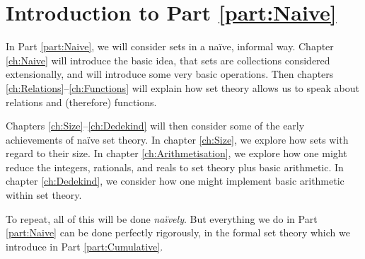 \documentclass[../../../include/open-logic-chapter]{subfiles}
\begin{document}
\chapter*{Introduction to Part \ref{part:Naive}}
\noindent In Part \ref{part:Naive}, we will consider sets in a na\"ive, informal way. Chapter \ref{ch:Naive} will introduce the basic idea, that sets are collections considered extensionally, and will introduce some very basic operations. Then chapters \ref{ch:Relations}--\ref{ch:Functions} will explain how set theory allows us to speak about relations and (therefore) functions. 

Chapters \ref{ch:Size}--\ref{ch:Dedekind} will then consider some of the early achievements of na\"ive set theory. In chapter \ref{ch:Size}, we explore how sets with regard to their size. In chapter \ref{ch:Arithmetisation}, we explore how one might reduce the integers, rationals, and reals to set theory plus basic arithmetic. In chapter \ref{ch:Dedekind}, we consider how one might implement basic arithmetic within set theory. 

To repeat, all of this will be done \emph{na\"ively}. But everything we do in Part \ref{part:Naive} can be done perfectly rigorously, in the formal set theory which we introduce in Part \ref{part:Cumulative}.
\end{document}
